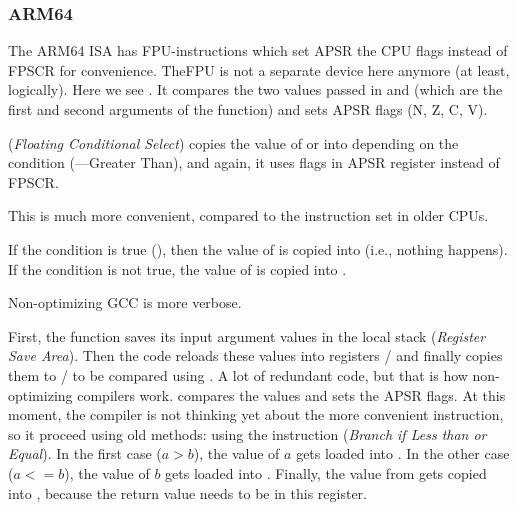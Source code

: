 \subsubsection{ARM64}




The ARM64 \ac{ISA} has FPU-instructions 
which set \ac{APSR} the CPU flags instead of \ac{FPSCR} for convenience.
The\ac{FPU} is not a separate device here anymore (at least, logically).
Here we see . It compares the two values passed in  and  (which are the first and second arguments of the function)
and sets \ac{APSR} flags (N, Z, C, V).

 (\emph{Floating Conditional Select}) copies the value of  or  into  depending on the condition (---Greater Than),
and again, it uses flags in \ac{APSR} register instead of \ac{FPSCR}.

This is much more convenient, compared to the instruction set in older CPUs.

If the condition is true (), then the value of  
is copied into  (i.e., nothing happens).
If the condition is not true, the value of  
is copied into .




Non-optimizing GCC is more verbose.

First, the function saves its input argument values in the local stack (\emph{Register Save Area}).
Then the code reloads these values into registers
/ and finally copies them to 
/ to be compared using . 
A lot of redundant code, 
but that is how non-optimizing compilers work.
 compares the values and sets the \ac{APSR} flags.
At this moment, 
the compiler is not thinking yet about the more convenient  instruction, so it proceed using old methods: 
using the  instruction (\emph{Branch if Less than or Equal}).
In the first case ($a>b$), the value of $a$ gets loaded 
into .
In the other case ($a<=b$), the value of $b$ gets loaded into 
.
Finally, the value from  gets copied into , 
because the return value needs to be in this 
register.

